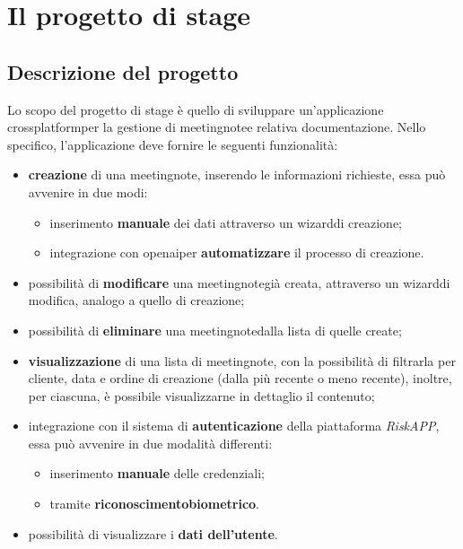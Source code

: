 \chapter{Il progetto di stage}
\label{cap:descrizione-stage}


\section{Descrizione del progetto}
\label{sec:descrizione-progetto}

Lo scopo del progetto di stage è quello di sviluppare un'applicazione \gls{crossplatform}\glsoccur per la gestione di \gls{meetingnote}\glsoccur e relativa documentazione.
Nello specifico, l'applicazione deve fornire le seguenti funzionalità:
\begin{itemize}
    \item \textbf{creazione} di una \gls{meetingnote}\glsoccur, inserendo le informazioni richieste, essa può avvenire in due modi:
    \begin{itemize}
        \item inserimento \textbf{manuale} dei dati attraverso un \gls{wizard}\glsoccur di creazione;
        \item integrazione con \gls{openai}\glsoccur per \textbf{automatizzare} il processo di creazione.
    \end{itemize}
    \item possibilità di \textbf{modificare} una \gls{meetingnote}\glsoccur già creata, attraverso un \gls{wizard}\glsoccur di modifica, analogo a quello di creazione;
    \item possibilità di \textbf{eliminare} una \gls{meetingnote}\glsoccur dalla lista di quelle create;
    \item \textbf{visualizzazione} di una lista di \gls{meetingnote}\glsoccur, con la possibilità di filtrarla per \gls{cliente}\glsoccur, data e ordine di creazione (dalla più recente o meno recente), inoltre, per ciascuna, è possibile visualizzarne in dettaglio il contenuto;
    \item integrazione con il sistema di \textbf{autenticazione} della piattaforma \emph{RiskAPP}, essa può avvenire in due modalità differenti:
    \begin{itemize}
        \item inserimento \textbf{manuale} delle credenziali;
        \item tramite \textbf{\gls{riconoscimentobiometrico}}\glsoccur.
    \end{itemize}
    \item possibilità di visualizzare i \textbf{dati dell'utente}.
\end{itemize}

